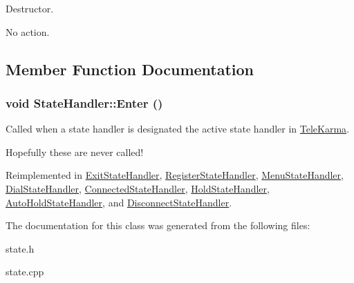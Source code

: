 Destructor. 

No action. 

\subsection{Member Function Documentation}
\hypertarget{classStateHandler_c08036e743cf5172d6931cf3b6d321c6}{
\subsubsection[{Enter}]{\setlength{\rightskip}{0pt plus 5cm}void StateHandler::Enter ()}}
\label{classStateHandler_c08036e743cf5172d6931cf3b6d321c6}


Called when a state handler is designated the active state handler in \hyperlink{classTeleKarma}{TeleKarma}. 

Hopefully these are never called! 

Reimplemented in \hyperlink{classExitStateHandler_a17a1677784b257819f1ec731d1e9bdb}{ExitStateHandler}, \hyperlink{classRegisterStateHandler_ce5bc429d43d18e9233f521c2edf930a}{RegisterStateHandler}, \hyperlink{classMenuStateHandler_b38fbf0fdf66be47ebb7e200a66925ba}{MenuStateHandler}, \hyperlink{classDialStateHandler_945709f5589569cf5441b1c779efed7c}{DialStateHandler}, \hyperlink{classConnectedStateHandler_3eb15025f62e77147d7e20590daabf3e}{ConnectedStateHandler}, \hyperlink{classHoldStateHandler_29f89f435a48b793e153ede7c5d94397}{HoldStateHandler}, \hyperlink{classAutoHoldStateHandler_e2ceac17b4e28f9ca869bd0130659aad}{AutoHoldStateHandler}, and \hyperlink{classDisconnectStateHandler_29fb86c820ff7ff183051170161347eb}{DisconnectStateHandler}.

The documentation for this class was generated from the following files:\begin{CompactItemize}
\item 
state.h\item 
state.cpp\end{CompactItemize}
